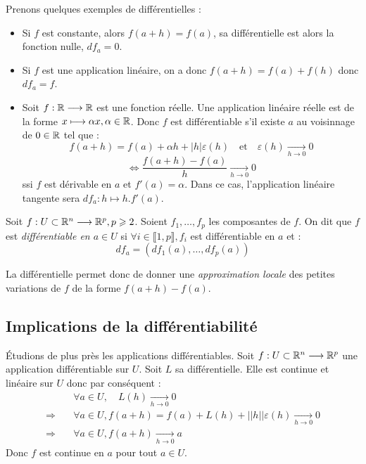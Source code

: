 \begin{example}
    Prenons quelques exemples de différentielles : 
    \begin{itemize}
        \item Si $f$ est constante, alors $f(a+h) = f(a)$, sa différentielle est alors la fonction nulle, $df_a = 0$. 
        \item Si $f$ est une application linéaire, on a donc $f(a+h) = f(a) + f(h)$ donc $df_a = f$. 
        \item Soit $f : \mathbb{R} \longrightarrow \mathbb{R}$ est une fonction réelle. Une application linéaire réelle est de la forme 
            $x \longmapsto \alpha x, \alpha \in \mathbb{R}$. Donc $f$ est différentiable s'il existe $a$ au voisinnage de 
            $0 \in \mathbb{R}$ tel que : 
                \[ f(a + h) = f(a) + \alpha h + |h| \varepsilon(h) \quad \text{et} \quad \varepsilon(h) \underset{h \to 0}{\longrightarrow} 0 \] 
                \[ \iff \frac{f(a + h) - f(a)}{h} \underset{h \to 0}{\longrightarrow} 0 \] 
            ssi $f$ est dérivable en $a$ et $f'(a) = \alpha$. 
            Dans ce cas, l'application linéaire tangente sera $df_a : h \longmapsto h . f'(a)$. 
    \end{itemize}
\end{example}

\begin{proposition}
    Soit $f : U \subset \mathbb{R}^n \longrightarrow \mathbb{R}^p, p \geqslant 2$. Soient $f_1, \dots, f_p$ les composantes de $f$. 
    On dit que $f$ est \emph{différentiable en $a \in U$} si $ \forall i \in \llbracket 1, p \rrbracket, f_i$ est 
    différentiable en $a$ et : 
        \[ df_a = (df_1(a), \dots, df_p(a)) \]  
\end{proposition}

\begin{remark}
    La différentielle permet donc de donner une \emph{approximation locale} des 
    petites variations de $f$ de la forme $f(a + h) - f(a)$. 
\end{remark}

\subsection{Implications de la différentiabilité}

Étudions de plus près les applications différentiables. Soit $f : U \subset \mathbb{R}^n \longrightarrow \mathbb{R}^p$ 
une application différentiable sur $U$. 
Soit $L$ sa différentielle. Elle est continue et linéaire sur $U$ donc par conséquent :
\begin{align*}
    & \forall a \in U, \quad L(h) \underset{h \to 0}{\longrightarrow} 0 \\ 
    \Longrightarrow \quad & \forall a \in U, f(a + h) = f(a) + L(h) + ||h|| \varepsilon(h) \underset{h \to 0}{\longrightarrow} 0 \\  
    \Longrightarrow \quad & \forall a \in U, f(a +h) \underset{h \to 0}{\longrightarrow} a 
\end{align*}
Donc $f$ est continue en $a$ pour tout $a \in U$. 

